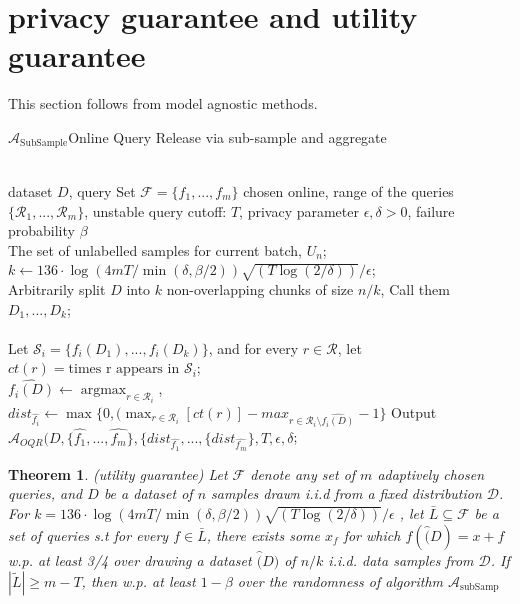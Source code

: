 \documentclass{article}
\newcommand{\argmax}{\mathop{\mathrm{argmax}}}
\def\cA{\mathcal{A}}
\def\cD{\mathcal{D}}
\def\cF{\mathcal{F}}
\def\cR{\mathcal{R}}
\def\cS{\mathcal{S}}
\newtheorem{theorem}{Theorem}
\theoremstyle{definition}
\begin{document}
\section{privacy guarantee and utility guarantee}
This section follows from model agnostic methods.
\begin{algorithm}[htb] 
\caption{ $\cA_{\text{SubSample}}$Online Query Release via sub-sample and aggregate}
\label{alg:Framwork} 
\begin{algorithmic}[1] 
\REQUIRE ~~\\ 
dataset $D$, query Set $\cF = \{f_1, ..., f_m\}$ chosen online, range of the queries $\{ \cR_1, ..., \cR_m\}$, unstable query cutoff: $T$, privacy parameter $\epsilon, \delta > 0$, failure probability $\beta$\\
The set of unlabelled samples for current batch, $U_n$;\\
$k \gets 136\cdot \log(4mT  /\min(\delta, \beta/2)) \sqrt{(T\log(2/\delta))}/\epsilon$;\\
Arbitrarily split $D$ into $k$ non-overlapping chunks of size $n/k$, Call them $D_1, ..., D_k$;\\
\ENSURE ~~\\
\STATE Let $\cS_i = \{ f_i(D_1), ..., f_i(D_k)\} $, and for every $r \in \cR$, let $ct(r) = \text{times r appears in } \cS_i$;\\
\STATE $ \hat{f_i(D)} \gets \argmax_{r \in \cR_i}$, $dist_{\hat{f_i}} \gets \max \{ 0, (\max_{r \in \cR_i}[ct(r)] - max_{r \in \cR_i \setminus \hat{f_i(D)}}-1 \}$
\ENDFOR
\STATE Output $\cA_{OQR}(D, \{\hat{f_1}, ..., \hat{f_m}\}, \{dist_{\hat{f_1}}, ..., \{dist_{\hat{f_m}}\}, T, \epsilon, \delta$; 
\label{algorithm1}
\end{algorithmic}
\end{algorithm}

\begin{theorem}(utility guarantee)
Let $\cF$ denote any set of $m$ adaptively chosen queries, and $D$ be a dataset of $n$ samples drawn i.i.d from a fixed distribution $\cD$. For $ k = 136\cdot \log(4mT  /\min(\delta, \beta/2)) \sqrt{(T\log(2/\delta))}/\epsilon$ , let  $\bar{L} \subseteq  \cF$ be a set of queries s.t for every $f \in \bar{L}$, there exists some $x_f$ 
for which $f(\hat(D)=x+f$ w.p. at least 3/4 over drawing a dataset $\hat(D)$ of $n/k$ i.i.d. data samples from $\cD$.  If $|\tilde{L}| \geq m-T$, then w.p. at least $1 -\beta$ over the randomness of algorithm $\cA_{\text{subSamp}}$
\end{theorem}
\end{document}
